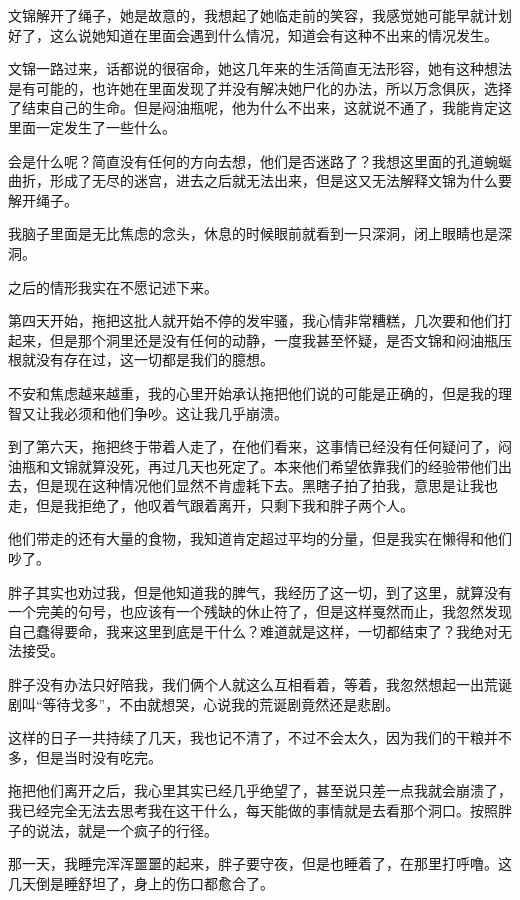 文锦解开了绳子，她是故意的，我想起了她临走前的笑容，我感觉她可能早就计划好了，这么说她知道在里面会遇到什么情况，知道会有这种不出来的情况发生。

文锦一路过来，话都说的很宿命，她这几年来的生活简直无法形容，她有这种想法是有可能的，也许她在里面发现了并没有解决她尸化的办法，所以万念俱灰，选择了结束自己的生命。但是闷油瓶呢，他为什么不出来，这就说不通了，我能肯定这里面一定发生了一些什么。

会是什么呢？简直没有任何的方向去想，他们是否迷路了？我想这里面的孔道蜿蜒曲折，形成了无尽的迷宫，进去之后就无法出来，但是这又无法解释文锦为什么要解开绳子。

我脑子里面是无比焦虑的念头，休息的时候眼前就看到一只深洞，闭上眼睛也是深洞。

之后的情形我实在不愿记述下来。

第四天开始，拖把这批人就开始不停的发牢骚，我心情非常糟糕，几次要和他们打起来，但是那个洞里还是没有任何的动静，一度我甚至怀疑，是否文锦和闷油瓶压根就没有存在过，这一切都是我们的臆想。

不安和焦虑越来越重，我的心里开始承认拖把他们说的可能是正确的，但是我的理智又让我必须和他们争吵。这让我几乎崩溃。

到了第六天，拖把终于带着人走了，在他们看来，这事情已经没有任何疑问了，闷油瓶和文锦就算没死，再过几天也死定了。本来他们希望依靠我们的经验带他们出去，但是现在这种情况他们显然不肯虚耗下去。黑瞎子拍了拍我，意思是让我也走，但是我拒绝了，他叹着气跟着离开，只剩下我和胖子两个人。

他们带走的还有大量的食物，我知道肯定超过平均的分量，但是我实在懒得和他们吵了。

胖子其实也劝过我，但是他知道我的脾气，我经历了这一切，到了这里，就算没有一个完美的句号，也应该有一个残缺的休止符了，但是这样戛然而止，我忽然发现自己蠢得要命，我来这里到底是干什么？难道就是这样，一切都结束了？我绝对无法接受。

胖子没有办法只好陪我，我们俩个人就这么互相看着，等着，我忽然想起一出荒诞剧叫“等待戈多”，不由就想哭，心说我的荒诞剧竟然还是悲剧。

这样的日子一共持续了几天，我也记不清了，不过不会太久，因为我们的干粮并不多，但是当时没有吃完。

拖把他们离开之后，我心里其实已经几乎绝望了，甚至说只差一点我就会崩溃了，我已经完全无法去思考我在这干什么，每天能做的事情就是去看那个洞口。按照胖子的说法，就是一个疯子的行径。

那一天，我睡完浑浑噩噩的起来，胖子要守夜，但是也睡着了，在那里打呼噜。这几天倒是睡舒坦了，身上的伤口都愈合了。

